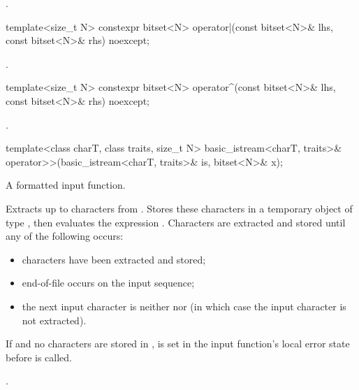 \begin{itemdescr}
\pnum
\returns
{}.
\end{itemdescr}

%
\begin{itemdecl}
template<size_t N>
  constexpr bitset<N> operator|(const bitset<N>& lhs, const bitset<N>& rhs) noexcept;
\end{itemdecl}

\begin{itemdescr}
\pnum
\returns
{}.
\end{itemdescr}

%
\begin{itemdecl}
template<size_t N>
  constexpr bitset<N> operator^(const bitset<N>& lhs, const bitset<N>& rhs) noexcept;
\end{itemdecl}

\begin{itemdescr}
\pnum
\returns
{}.
\end{itemdescr}

%
\begin{itemdecl}
template<class charT, class traits, size_t N>
  basic_istream<charT, traits>&
    operator>>(basic_istream<charT, traits>& is, bitset<N>& x);
\end{itemdecl}

\begin{itemdescr}
\pnum
A formatted input function.

\pnum
\effects
Extracts up to  characters from .
Stores these characters in a temporary object  of type
,
then evaluates the expression
.
Characters are extracted and stored until any of the following occurs:
\begin{itemize}
\item
{} characters have been extracted and stored;
\item
{}%
end-of-file occurs on the input sequence;
\item
the next input character is neither
nor
(in which case the input character is not extracted).
\end{itemize}

\pnum
If  and no characters are stored in ,
 is set in the input function's local error state
before  is called.

\pnum
\returns
{}.
\end{itemdescr}

